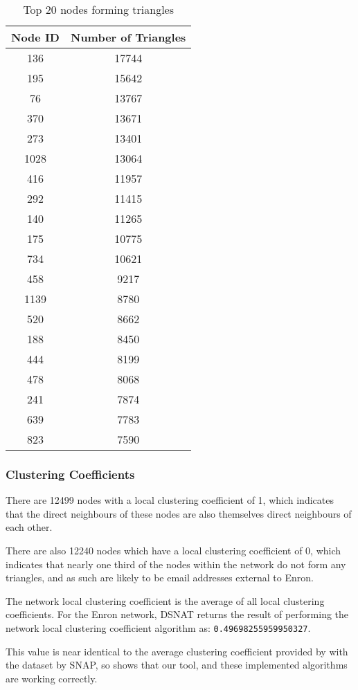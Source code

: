 \begin{table}%
\centering
\begin{tabular}{|c|c|}
\hline
Node ID & Number of Triangles \\
\hline
136 & 17744 \\
195 & 15642 \\
76 & 13767 \\
370 & 13671 \\
273 & 13401 \\
1028 & 13064 \\
416 & 11957 \\
292 & 11415 \\
140 & 11265 \\
175 & 10775 \\
734 & 10621 \\
458 & 9217 \\
1139 & 8780 \\
520 & 8662 \\
188 & 8450 \\
444 & 8199 \\
478 & 8068 \\
241 & 7874 \\
639 & 7783 \\
823 & 7590 \\
\hline
\end{tabular}
\caption{Top 20 nodes forming triangles}
\label{tab:enrontriangles}
\end{table}

\subsubsection{Clustering Coefficients}
There are 12499 nodes with a local clustering coefficient of 1, which indicates that the direct neighbours of these nodes are also themselves direct neighbours of each other.

There are also 12240 nodes which have a local clustering coefficient of 0, which indicates that nearly one third of the nodes within the network do not form any triangles, and as such are likely to be email addresses external to Enron.

The network local clustering coefficient is the average of all local clustering coefficients. For the Enron network, DSNAT returns the result of performing the network local clustering coefficient algorithm as: {\tt 0.49698255959950327}.

This value is near identical to the average clustering coefficient provided by with the dataset by SNAP, so shows that our tool, and these implemented algorithms are working correctly.

